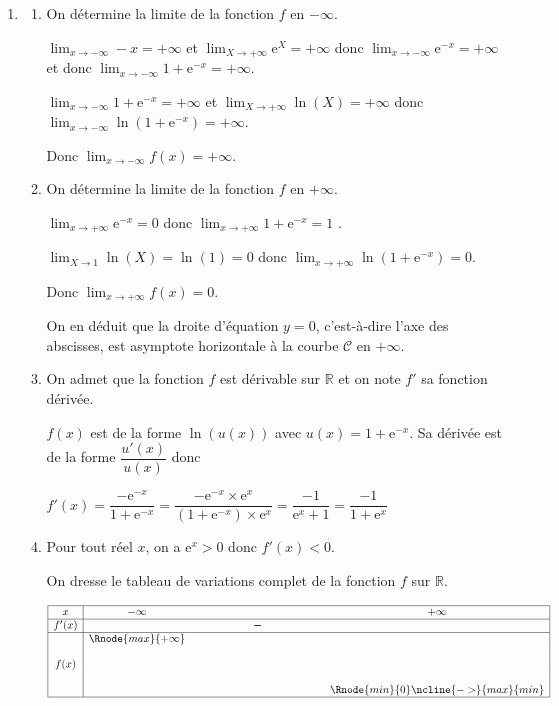 \documentclass[10pt]{article}
\providecommand{\R}{\mathbb{R}}
\providecommand{\e}{{\mathrm{e}}}
\providecommand{\ds}{\displaystyle}
\begin{document}
\begin{enumerate}
\item 
	\begin{enumerate}
		\item On détermine la limite de la fonction $f$ en $-\infty$.
		
$\ds\lim_{x\to -\infty} -x = +\infty$ et $\ds\lim_{X\to +\infty} \e^{X}=+\infty$ donc $\ds\lim_{x\to -\infty} \e^{-x}=+\infty$ et donc $\ds\lim_{x\to -\infty} 1+\e^{-x}=+\infty$.

$\ds\lim_{x\to -\infty} 1+\e^{-x}=+\infty$ et $\ds\lim_{X\to +\infty} \ln(X)=+\infty$ donc $\ds\lim_{x\to -\infty} \ln\left (1+\e^{-x}\right )=+\infty$.

Donc $\ds\lim_{x\to -\infty} f(x)=+\infty$.
		
		\item On détermine la limite de la fonction $f$ en $+\infty$.
		
$\ds\lim_{x\to +\infty} \e^{-x} = 0$ donc $\ds\lim_{x\to +\infty} 1+\e^{-x} = 1$ .

$\ds\lim_{X\to 1} \ln(X)= \ln(1) = 0$ donc $\ds\lim_{x\to +\infty} \ln\left (1+\e^{-x}\right ) = 0$.

Donc $\ds\lim_{x\to +\infty} f(x)=0$.



On en déduit que la droite d'équation $y=0$, c'est-à-dire l'axe des abscisses, est asymptote horizontale à la courbe $\mathcal{C}$ en $+\infty$.

		\item On admet que la fonction $f$ est dérivable sur $\R$ et on note $f'$ sa fonction dérivée.

$f(x)$ est de la forme $\ln(u(x))$ avec $u(x)=1+\e^{-x}$.
Sa dérivée est de la forme $\dfrac{u'(x)}{u(x)}$ donc

$f'(x)= \dfrac{-\e^{-x}}{1+\e^{-x}} =  \dfrac{-\e^{-x}\times \e^{x}}{\left (1+\e^{-x}\right )\times \e^{x}} = \dfrac{-1}{\e^{x}+1}=\dfrac{-1}{1+\e^{x}}$
		

		\item Pour tout réel $x$, on a $\e^{x}>0$ donc $f'(x)<0$.
		
On dresse le tableau de variations complet de la fonction $f$ sur $\R$.

\begin{center}
{\renewcommand{\arraystretch}{1.3}
\def\esp{\hspace*{4cm}}
\def\hauteur{20pt}
$\begin{array}{|c| *3{c}|}
\hline
 x & -\infty   & \esp & +\infty \\
 \hline
f'(x) &   & \pmb{-} & \\  
\hline
  &  \Rnode{max}{+\infty} &    &    \\
f(x) & &  &  \rule{0pt}{\hauteur} \\
 &      & & \Rnode{min}{0} \rule{0pt}{\hauteur}
\ncline{->}{max}{min}
\\
\hline
\end{array}$
}
\end{center}


\end{enumerate}
\end{enumerate}
\end{document}
